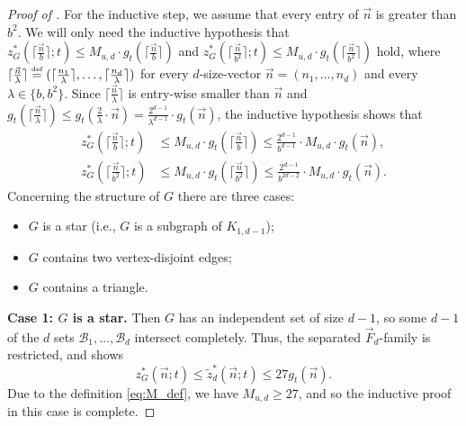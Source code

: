 \documentclass[11pt]{article}
\theoremstyle{definition}
\newcommand*{\eqdef}{\stackrel{\mbox{\normalfont\tiny def}}{=}} %
\newcommand*{\vF}{\vec{F}}
\newcommand*{\cB}{\mathcal{B}}
\newcommand*{\vn}{\vec{n}}
\newcommand*{\wz}{\widetilde{z}}
\begin{document}
\begin{proof}[Proof of ]
    For the inductive step, we assume that every entry of $\vn$ is greater than $b^2$. We will only need the inductive hypothesis that $z^*_G(\lceil\frac{\vn}{b}\rceil; t)\le M_{u, d} \cdot g_t(\lceil\frac{\vn}{b}\rceil)$ and $z^*_G(\lceil\frac{\vn}{b^2}\rceil; t) \le M_{u, d} \cdot g_t(\lceil\frac{\vn}{b^2}\rceil)$ hold, where $\lceil\frac{\vn}{\lambda}\rceil \eqdef (\lceil\frac{n_1}{\lambda}\rceil, \dots, \lceil\frac{n_d}{\lambda}\rceil)$ for every $d$-size-vector $\vn = (n_1, \dots, n_d)$ and every $\lambda \in \{b, b^2\}$. Since $\lceil\tfrac{\vn}{\lambda}\rceil$ is entry-wise smaller than $\vn$ and $g_t(\lceil\tfrac{\vn}{\lambda}\rceil) \le g_t(\tfrac{2}{\lambda} \cdot \vn) = \frac{2^{d-1}}{\lambda^{d-1}} \cdot g_t(\vn)$, the inductive hypothesis shows that
    \begin{align}
        z^*_G(\lceil\tfrac{\vn}{b}\rceil; t) &\le M_{u, d} \cdot g_t(\lceil\tfrac{\vn}{b}\rceil) \le \tfrac{2^{d-1}}{b^{d-1}} \cdot M_{u, d} \cdot g_t(\vn), \label{eq:b_ceil} \\
        z^*_G(\lceil\tfrac{\vn}{b^2}\rceil; t) &\le M_{u, d} \cdot g_t(\lceil\tfrac{\vn}{b^2}\rceil) \le \tfrac{2^{d-1}}{b^{2d-2}} \cdot M_{u, d} \cdot g_t(\vn). \label{eq:b2_ceil} 
    \end{align}
    Concerning the structure of $G$ there are three cases: 
    \vspace{-0.5em}
    \begin{itemize}
        \item $G$ is a star (i.e., $G$ is a subgraph of $K_{1, d-1}$); 
        \vspace{-0.5em}
        \item $G$ contains two vertex-disjoint edges; 
        \vspace{-0.5em}
        \item $G$ contains a triangle. 
    \end{itemize}
    \vspace{-0.5em}

    \medskip
    \noindent\textbf{Case 1: $G$ is a star.}
    Then $G$ has an independent set of size $d - 1$, so some $d - 1$ of the $d$ sets $\cB_1, \dots, \cB_d$ intersect completely. Thus, the separated $\vF_d$-family is restricted, and  shows
    \[
    z^*_G(\vn; t) \le \wz_d^*(\vn; t) \le 27 g_t(\vn). 
    \]
    Due to the definition \eqref{eq:M_def}, we have $M_{u, d} \ge 27$, and so the inductive proof in this case is complete. 
    

\end{proof}
\end{document}
